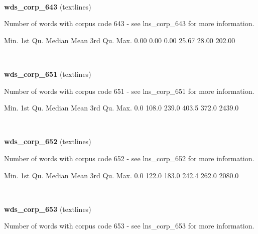 \documentclass[]{article}
\newenvironment{Shaded}{\begin{snugshade}}{\end{snugshade}}
\newcommand{\FloatTok}[1]{\textcolor[rgb]{0.00,0.00,0.81}{{#1}}}
\newcommand{\NormalTok}[1]{{#1}}
\begin{document}
~

\vspace{1em}

\textbf{wds\_corp\_643} (textlines)

Number of words with corpus code 643 - see lns\_corp\_643 for more
information.

\begin{Shaded}
\begin{Highlighting}[]
   \NormalTok{Min. 1st Qu.  Median    Mean 3rd Qu.    Max. }
   \FloatTok{0.00}    \FloatTok{0.00}    \FloatTok{0.00}   \FloatTok{25.67}   \FloatTok{28.00}  \FloatTok{202.00} 
\end{Highlighting}
\end{Shaded}

~

\vspace{1em}

\textbf{wds\_corp\_651} (textlines)

Number of words with corpus code 651 - see lns\_corp\_651 for more
information.

\begin{Shaded}
\begin{Highlighting}[]
   \NormalTok{Min. 1st Qu.  Median    Mean 3rd Qu.    Max. }
    \FloatTok{0.0}   \FloatTok{108.0}   \FloatTok{239.0}   \FloatTok{403.5}   \FloatTok{372.0}  \FloatTok{2439.0} 
\end{Highlighting}
\end{Shaded}

~

\vspace{1em}

\textbf{wds\_corp\_652} (textlines)

Number of words with corpus code 652 - see lns\_corp\_652 for more
information.

\begin{Shaded}
\begin{Highlighting}[]
   \NormalTok{Min. 1st Qu.  Median    Mean 3rd Qu.    Max. }
    \FloatTok{0.0}   \FloatTok{122.0}   \FloatTok{183.0}   \FloatTok{242.4}   \FloatTok{262.0}  \FloatTok{2080.0} 
\end{Highlighting}
\end{Shaded}

~

\vspace{1em}

\textbf{wds\_corp\_653} (textlines)

Number of words with corpus code 653 - see lns\_corp\_653 for more
information.
\end{document}
